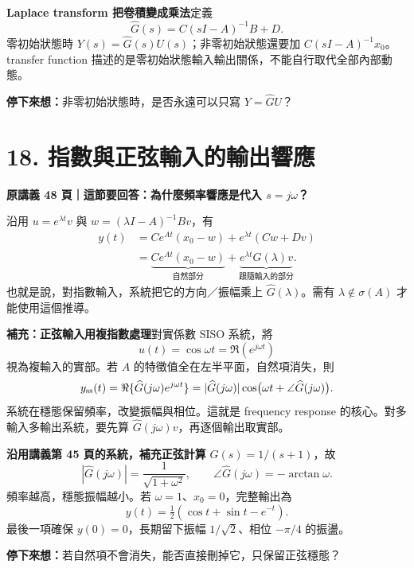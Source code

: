 \documentclass[12pt,a4paper]{article}
\newcommand{\topic}[3]{\clearpage\section*{#1}\textcolor{accent}{\textbf{原講義 #2 頁｜這節要回答：#3}}\par}
\newcommand{\checkq}[1]{\par\textbf{停下來想：}#1\par}
\begin{document}
\textbf{Laplace transform 把卷積變成乘法}\quad 定義
\[
\boxed{\widehat G(s)=C(sI-A)^{-1}B+D.}
\]
零初始狀態時 $Y(s)=\widehat G(s)U(s)$；非零初始狀態還要加 $C(sI-A)^{-1}x_0$。transfer function 描述的是零初始狀態輸入輸出關係，不能自行取代全部內部動態。
\checkq{非零初始狀態時，是否永遠可以只寫 $Y=\widehat G U$？}

\topic{18. 指數與正弦輸入的輸出響應}{48}{為什麼頻率響應是代入 $s=j\omega$？}
沿用 $u=e^{\lambda t}v$ 與 $w=(\lambda I-A)^{-1}Bv$，有
\begin{align*}
 y(t)&=Ce^{At}(x_0-w)+e^{\lambda t}(Cw+Dv)\\
 &=\underbrace{Ce^{At}(x_0-w)}_{\text{自然部分}}
 +\underbrace{e^{\lambda t}\widehat G(\lambda)v}_{\text{跟隨輸入的部分}}.
\end{align*}
也就是說，對指數輸入，系統把它的方向／振幅乘上 $\widehat G(\lambda)$。需有 $\lambda\notin\sigma(A)$ 才能使用這個推導。

\textbf{補充：正弦輸入用複指數處理}\quad 對實係數 SISO 系統，將
\[
 u(t)=\cos\omega t=\Re(e^{j\omega t})
\]
視為複輸入的實部。若 $A$ 的特徵值全在左半平面，自然項消失，則
\[
 y_{\rm ss}(t)=\Re\{\widehat G(j\omega)e^{j\omega t}\}
 =|\widehat G(j\omega)|\cos\bigl(\omega t+\angle\widehat G(j\omega)\bigr).
\]
系統在穩態保留頻率，改變振幅與相位。這就是 frequency response 的核心。對多輸入多輸出系統，要先算 $\widehat G(j\omega)v$，再逐個輸出取實部。

\textbf{沿用講義第 45 頁的系統，補充正弦計算}\quad
$\widehat G(s)=1/(s+1)$，故
\[
 |\widehat G(j\omega)|=\frac1{\sqrt{1+\omega^2}},\qquad
 \angle\widehat G(j\omega)=-\arctan\omega.
\]
頻率越高，穩態振幅越小。若 $\omega=1$、$x_0=0$，完整輸出為
\[
 y(t)=\tfrac12(\cos t+\sin t-e^{-t}).
\]
最後一項確保 $y(0)=0$，長期留下振幅 $1/\sqrt2$、相位 $-\pi/4$ 的振盪。
\checkq{若自然項不會消失，能否直接刪掉它，只保留正弦穩態？}
\end{document}
